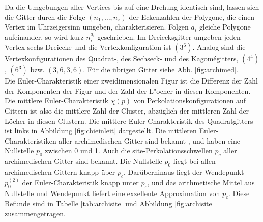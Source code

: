 Da die Umgebungen aller Vertices bis auf eine Drehung identisch sind, lassen sich die Gitter durch die Folge $(n_1,\ldots,n_z)$ der Eckenzahlen der Polygone, die einen Vertex im Uhrzeigersinn umgeben, charakterisieren. Folgen $a_i$ gleiche Polygone aufeinander, so wird kurz $n_i^{a_i}$ geschrieben. Im Dreiecksgitter umgeben jeden Vertex sechs Dreiecke und die Vertexkonfiguration ist $(3^6)$. Analog sind die Vertexkonfigurationen des \mbox{Quadrat-,} des \mbox{Sechseck-} und des Kagom\'egitters,  $(4^4)$, $(6^3)$ bzw. $(3,6,3,6)$. F\"ur die \"ubrigen Gitter siehe Abb. \ref{fig:archimed}.
\\Die Euler-Charakteristik einer zweidimensionalen Figur ist die Differenz der Zahl der Komponenten der Figur und der Zahl der L"ocher in diesen Komponenten. Die mittlere Euler-Charakteristik $\chi(p)$ von Perkolationskonfigurationen auf Gittern ist also die mittlere Zahl der Cluster, abz\"uglich der mittleren Zahl der L\"ocher in diesen Clustern. Die mittlere Euler-Charakteristik des Quadratgitters ist links in Abbildung \ref{fig:chieinleit} dargestellt. Die mittleren Euler-Charakteristiken aller archimedischen Gitter sind bekannt \cite{Wagner:02}, und haben eine Nullstelle $p_0$ zwischen 0 und 1. Auch die site-Perkolationsschwellen $p_c$ aller archimedischen Gitter \cite{Suding:99} sind bekannt. Die Nullstelle $p_0$ liegt bei allen archimedischen Gittern knapp \"uber $p_c$. Dar\"uberhinaus liegt der Wendepunkt $p_0^{(2)}$ der Euler-Charakteristik knapp unter $p_c$, und das arithmetische Mittel aus Nullstelle und Wendepunkt liefert eine exzellente Approximation von $p_c$. Diese Befunde sind in  Tabelle \ref{tab:archisite} und Abbildung \ref{fig:archisite} zusammengetragen.\\
